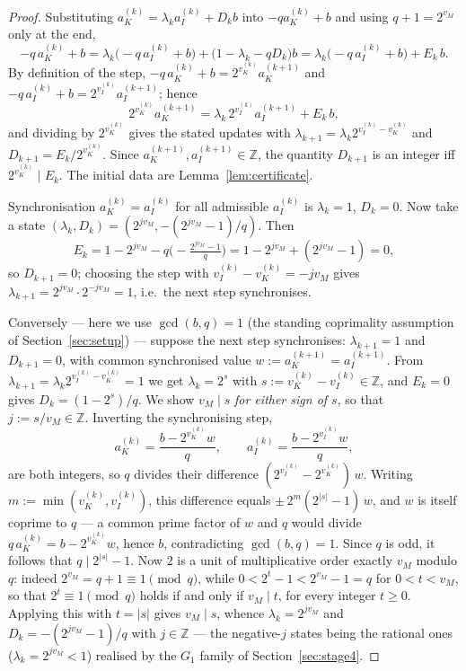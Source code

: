 \documentclass[11pt,reqno]{amsart}
\theoremstyle{plain}
\theoremstyle{definition}
\theoremstyle{remark}
\newcommand{\Z}{\mathbb{Z}}
\newcommand{\vk}{v_{K}}
\newcommand{\vi}{v_{I}}
\newcommand{\aK}{a_{K}}
\newcommand{\aI}{a_{I}}
\newcommand{\vM}{v_{M}}
\begin{document}
\begin{proof}
Substituting $\aK^{(k)} = \lambda_k \aI^{(k)} + D_k b$ into $-q\aK^{(k)} + b$
and using $q + 1 = 2^{\vM}$ only at the end,
\[
-q\,\aK^{(k)} + b
= \lambda_k\big(-q\,\aI^{(k)} + b\big) + \big(1 - \lambda_k - q D_k\big) b
= \lambda_k\big(-q\,\aI^{(k)} + b\big) + E_k\, b .
\]
By definition of the step, $-q\,\aK^{(k)} + b = 2^{\vk^{(k)}} \aK^{(k+1)}$
and $-q\,\aI^{(k)} + b = 2^{\vi^{(k)}} \aI^{(k+1)}$; hence
\[
2^{\vk^{(k)}} \aK^{(k+1)}
= \lambda_k\, 2^{\vi^{(k)}} \aI^{(k+1)} + E_k\, b ,
\]
and dividing by $2^{\vk^{(k)}}$ gives the stated updates with
$\lambda_{k+1} = \lambda_k 2^{\vi^{(k)} - \vk^{(k)}}$ and
$D_{k+1} = E_k / 2^{\vk^{(k)}}$. Since $\aK^{(k+1)}, \aI^{(k+1)} \in \Z$, the
quantity $D_{k+1}$ is an integer iff $2^{\vk^{(k)}} \mid E_k$. The initial
data are Lemma~\ref{lem:certificate}.

Synchronisation $\aK^{(k)} = \aI^{(k)}$ for all admissible $\aI^{(k)}$ is
$\lambda_k = 1$, $D_k = 0$. Now take a state $(\lambda_k, D_k) =
(2^{j\vM}, -(2^{j\vM} - 1)/q)$. Then
\[
E_k = 1 - 2^{j\vM} - q\Big(\!-\tfrac{2^{j\vM} - 1}{q}\Big)
   = 1 - 2^{j\vM} + (2^{j\vM} - 1) = 0 ,
\]
so $D_{k+1} = 0$; choosing the step with $\vi^{(k)} - \vk^{(k)} = -j\vM$
gives $\lambda_{k+1} = 2^{j\vM} \cdot 2^{-j\vM} = 1$, i.e.\ the next step
synchronises.

Conversely --- here we use $\gcd(b, q) = 1$ (the standing coprimality
assumption of Section~\ref{sec:setup}) --- suppose the next step
synchronises: $\lambda_{k+1} = 1$ and $D_{k+1} = 0$, with common synchronised
value $w := \aK^{(k+1)} = \aI^{(k+1)}$. From $\lambda_{k+1} = \lambda_k 2^{\vi^{(k)} - \vk^{(k)}} = 1$ we
get $\lambda_k = 2^{s}$ with $s := \vk^{(k)} - \vi^{(k)} \in \Z$, and
$E_k = 0$ gives $D_k = (1 - 2^{s})/q$. We show $\vM \mid s$ \emph{for either
sign of $s$}, so that $j := s/\vM \in \Z$. Inverting the synchronising step,
\[
\aK^{(k)} = \frac{b - 2^{\vk^{(k)}} w}{q}, \qquad
\aI^{(k)} = \frac{b - 2^{\vi^{(k)}} w}{q},
\]
are both integers, so $q$ divides their difference
$(2^{\vi^{(k)}} - 2^{\vk^{(k)}})\, w$. Writing $m := \min(\vk^{(k)},
\vi^{(k)})$, this difference equals $\pm\, 2^{m}(2^{\lvert s\rvert} - 1)\, w$,
and $w$ is itself coprime to $q$ --- a common prime factor of $w$ and $q$
would divide $q\,\aK^{(k)} = b - 2^{\vk^{(k)}} w$, hence $b$, contradicting
$\gcd(b, q) = 1$. Since $q$ is odd, it follows that $q \mid 2^{\lvert
s\rvert} - 1$. Now $2$ is a unit of multiplicative order exactly $\vM$
modulo $q$: indeed $2^{\vM} = q + 1 \equiv 1 \pmod q$, while
$0 < 2^t - 1 < 2^{\vM} - 1 = q$ for $0 < t < \vM$, so that
$2^t \equiv 1 \pmod q$ holds if and only if $\vM \mid t$, for every integer
$t \ge 0$. Applying this with $t = \lvert s\rvert$ gives $\vM \mid s$, whence
$\lambda_k = 2^{j\vM}$ and $D_k = -(2^{j\vM} - 1)/q$ with $j \in \Z$ --- the
negative-$j$ states being the rational ones ($\lambda_k = 2^{j\vM} < 1$)
realised by the $G_1$ family of Section~\ref{sec:stage4}.
\end{proof}
\end{document}
